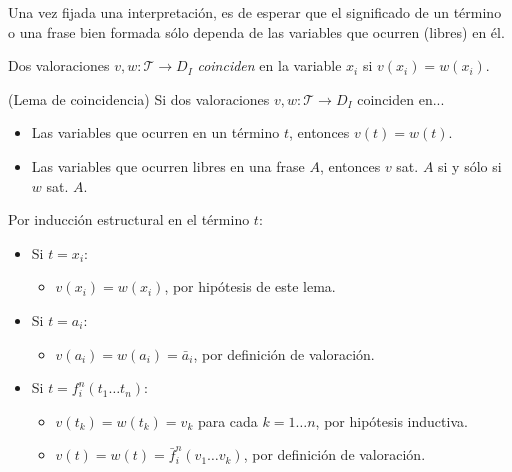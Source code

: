 \begin{motivation}
Una vez fijada una interpretación, es de esperar que el significado de un término o una frase bien formada sólo dependa de las variables que ocurren (libres) en él.
\end{motivation}

\begin{definition}
Dos valoraciones $v, w : \mathscr T \to D_I$ \textit{coinciden} en la variable $x_i$ si $v(x_i) = w(x_i)$.
\end{definition}

\begin{proposition}
(Lema de coincidencia) Si dos valoraciones $v, w : \mathscr T \to D_I$ coinciden en...

\begin{itemize}
    \item Las variables que ocurren en un término $t$, entonces $v(t) = w(t)$.
    \item Las variables que ocurren libres en una frase $A$, entonces $v$ sat. $A$ si y sólo si $w$ sat. $A$.
\end{itemize}
\end{proposition}

\begin{prove}
Por inducción estructural en el término $t$:

\begin{itemize}
    \item Si $t = x_i$:
    \begin{itemize}
        \item $v(x_i) = w(x_i)$, por hipótesis de este lema.
    \end{itemize}
    
    \item Si $t = a_i$:
    \begin{itemize}
        \item $v(a_i) = w(a_i) = \bar a_i$, por definición de valoración.
    \end{itemize}
    
    \item Si $t = f_i^n(t_1 \dots t_n)$:
    \begin{itemize}
        \item $v(t_k) = w(t_k) = v_k$ para cada $k = 1 \dots n$, por hipótesis inductiva.
        \item $v(t) = w(t) = \bar f_i^n(v_1 \dots v_k)$, por definición de valoración.
    \end{itemize}
\end{itemize}
\end{prove}

